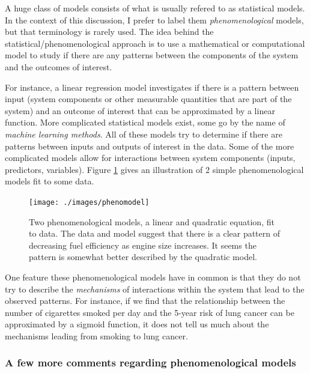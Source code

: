 \documentclass[
]{book}
\begin{document}
A huge class of models consists of what is usually refered to as statistical models. In the context of this discussion, I prefer to label them \emph{phenomenological} models, but that terminology is rarely used. The idea behind the statistical/phenomenological approach is to use a mathematical or computational model to study if there are any patterns between the components of the system and the outcomes of interest.

For instance, a linear regression model investigates if there is a pattern between input (system components or other measurable quantities that are part of the system) and an outcome of interest that can be approximated by a linear function. More complicated statistical models exist, some go by the name of \emph{machine learning methods}. All of these models try to determine if there are patterns between inputs and outputs of interest in the data. Some of the more complicated models allow for interactions between system components (inputs, predictors, variables). Figure \ref{fig:phenomodel} gives an illustration of 2 simple phenomenological models fit to some data.

\begin{figure}
\texttt{[image: ./images/phenomodel]} \caption{Two phenomenological models, a linear and quadratic equation, fit to data. The data and model suggest that there is a clear pattern of decreasing fuel efficiency as engine size increases. It seems the pattern is somewhat better described by the quadratic model.}\label{fig:phenomodel}
\end{figure}

One feature these phenomenological models have in common is that they do not try to describe the \emph{mechanisms} of interactions within the system that lead to the observed patterns. For instance, if we find that the relationship between the number of cigarettes smoked per day and the 5-year risk of lung cancer can be approximated by a sigmoid function, it does not tell us much about the mechanisms leading from smoking to lung cancer.

\hypertarget{mynotebox}{%
\subsubsection{A few more comments regarding phenomenological models}\label{mynotebox}}
\end{document}
